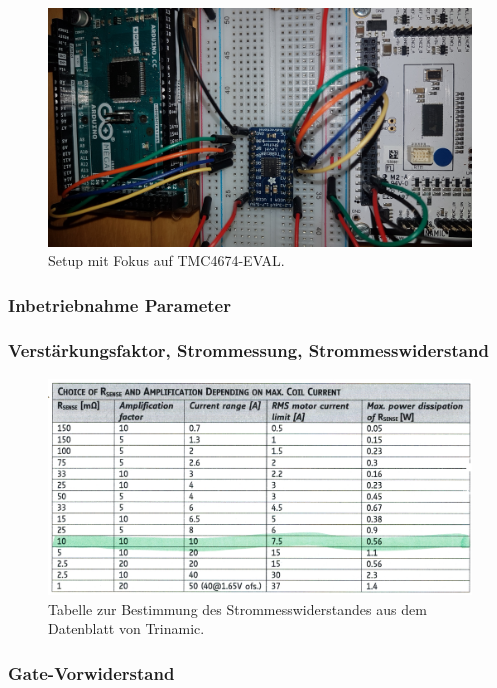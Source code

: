\begin{figure}[H]
	\centering
	\includegraphics[angle=180,width=\textwidth]{graphics/1_EVAL}
	\caption{Setup mit Fokus auf TMC4674-EVAL.}
	\label{fig:1_EVAL}
\end{figure}

\subsubsection{Inbetriebnahme Parameter}\label{Appendix:TMC6200_SPI}

\subsubsection{Verstärkungsfaktor, Strommessung, Strommesswiderstand}

\begin{figure}[H]
	\centering
	\includegraphics[width=\textwidth]{graphics/Tabelle_Shunts.png}
	\caption{Tabelle zur Bestimmung des Strommesswiderstandes aus dem Datenblatt von Trinamic.}
	\label{fig:Tabelle_Shunts}
\end{figure}

\subsubsection{Gate-Vorwiderstand}

